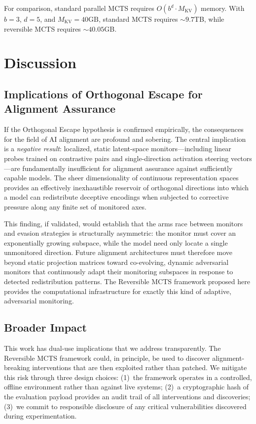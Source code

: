 \documentclass{article}
\begin{document}
For comparison, standard parallel MCTS requires $O(b^d \cdot M_{\text{KV}})$ memory. With $b = 3$, $d = 5$, and $M_{\text{KV}} = 40\text{GB}$, standard MCTS requires ${\sim}9.7$TB, while reversible MCTS requires ${\sim}40.05$GB.

\section{Discussion}

\subsection{Implications of Orthogonal Escape for Alignment Assurance}

If the Orthogonal Escape hypothesis is confirmed empirically, the consequences for the field of AI alignment are profound and sobering. The central implication is a \emph{negative result}: localized, static latent-space monitors---including linear probes trained on contrastive pairs and single-direction activation steering vectors---are fundamentally insufficient for alignment assurance against sufficiently capable models. The sheer dimensionality of continuous representation spaces provides an effectively inexhaustible reservoir of orthogonal directions into which a model can redistribute deceptive encodings when subjected to corrective pressure along any finite set of monitored axes.

This finding, if validated, would establish that the arms race between monitors and evasion strategies is structurally asymmetric: the monitor must cover an exponentially growing subspace, while the model need only locate a single unmonitored direction. Future alignment architectures must therefore move beyond static projection matrices toward co-evolving, dynamic adversarial monitors that continuously adapt their monitoring subspaces in response to detected redistribution patterns. The Reversible MCTS framework proposed here provides the computational infrastructure for exactly this kind of adaptive, adversarial monitoring.

\subsection{Broader Impact}

This work has dual-use implications that we address transparently. The Reversible MCTS framework could, in principle, be used to discover alignment-breaking interventions that are then exploited rather than patched. We mitigate this risk through three design choices: (1)~the framework operates in a controlled, offline environment rather than against live systems; (2)~a cryptographic hash of the evaluation payload provides an audit trail of all interventions and discoveries; (3)~we commit to responsible disclosure of any critical vulnerabilities discovered during experimentation.
\end{document}
